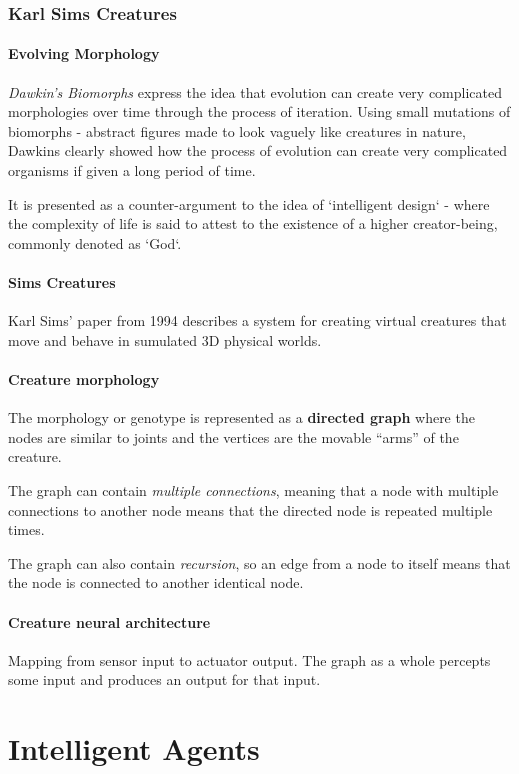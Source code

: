 \subsubsection{Karl Sims Creatures}

\paragraph{Evolving Morphology} \textit{Dawkin's Biomorphs} express the idea that evolution can create very complicated morphologies over time through the process of iteration. Using small mutations of biomorphs - abstract figures made to look vaguely like creatures in nature, Dawkins clearly showed how the process of evolution can create very complicated organisms if given a long period of time. 

It is presented as a counter-argument to the idea of `intelligent design` - where the complexity of life is said to attest to the existence of a higher creator-being, commonly denoted as `God`.

\paragraph{Sims Creatures} Karl Sims' paper from 1994 describes a system for creating virtual creatures that move and behave in sumulated 3D physical worlds.

\paragraph{Creature morphology} The morphology or genotype is represented as a \textbf{directed graph} where the nodes are similar to joints and the vertices are the movable ``arms'' of the creature.

The graph can contain \textit{multiple connections}, meaning that a node with multiple connections to another node means that the directed node is repeated multiple times.

The graph can also contain \textit{recursion}, so an edge from a node to itself means that the node is connected to another identical node.

\paragraph{Creature neural architecture} Mapping from sensor input to actuator output. The graph as a whole percepts some input and produces an output for that input.


\section{Intelligent Agents}

